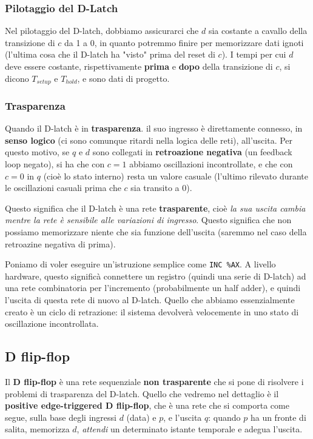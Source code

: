 \documentclass[a4paper,11pt]{article}
\begin{document}
\subsubsection{Pilotaggio del D-Latch}
Nel pilotaggio del D-latch, dobbiamo assicurarci che $d$ sia costante a cavallo della transizione di $c$ da 1 a 0, in quanto potremmo finire per memorizzare dati ignoti (l'ultima cosa che il D-latch ha "visto" prima del reset di $c$).
I tempi per cui $d$ deve essere costante, rispettivamente \textbf{prima} e \textbf{dopo} della transizione di $c$, si dicono $T_{setup}$ e $T_{hold}$, e sono dati di progetto.

\subsubsection{Trasparenza}
Quando il D-latch è in \textbf{trasparenza}. il suo ingresso è direttamente connesso, in \textbf{senso logico} (ci sono comunque ritardi nella logica delle reti), all'uscita.
Per questo motivo, se $q$ e $d$ sono collegati in \textbf{retroazione negativa} (un feedback loop negato), si ha che con $c=1$ abbiamo oscillazioni incontrollate, e che con $c=0$ in $q$ (cioè lo stato interno) resta un valore casuale (l'ultimo rilevato durante le oscillazioni casuali prima che $c$ sia transito a 0).

Questo significa che il D-latch è una rete \textbf{trasparente}, cioè \textit{la sua uscita cambia mentre la rete è sensibile alle variazioni di ingresso}.
Questo significa che non possiamo memorizzare niente che sia funzione dell'uscita (saremmo nel caso della retroazine negativa di prima).

Poniamo di voler eseguire un'istruzione semplice come \lstinline|INC %AX|. 
A livello hardware, questo significà connettere un registro (quindi una serie di D-latch) ad una rete combinatoria per l'incremento (probabilmente un half adder), e quindi l'uscita di questa rete di nuovo al D-latch.
Quello che abbiamo essenzialmente creato è un ciclo di retrazione: il sistema devolverà velocemente in uno stato di oscillazione incontrollata.

\subsection{D flip-flop}
Il \textbf{D flip-flop} è una rete sequenziale \textbf{non trasparente} che si pone di risolvere i problemi di trasparenza del D-latch.
Quello che vedremo nel dettaglio è il \textbf{positive edge-triggered D flip-flop}, che è una rete che si comporta come segue, sulla base degli ingressi $d$ (data) e $p$, e l'uscita $q$: quando $p$ ha un fronte di salita, memorizza $d$, \textit{attendi} un determinato istante temporale e adegua l'uscita.
\end{document}
